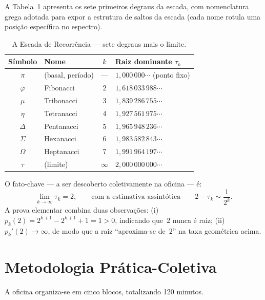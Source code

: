 \documentclass[11pt,a4paper]{article}
\begin{document}
A Tabela~\ref{tab:escada} apresenta os sete primeiros degraus da escada, com nomenclatura grega adotada para expor a estrutura de saltos da escada (cada nome rotula uma posição específica no espectro).

\begin{table}[h]
\centering
\small
\begin{tabular}{@{}clcl@{}}
\toprule
Símbolo & Nome & $k$ & Raiz dominante $\tau_k$ \\
\midrule
$\pi$ & (basal, período) & --- & $1{,}000\,000\cdots$ (ponto fixo) \\
$\varphi$ & Fibonacci        & 2 & $1{,}618\,033\,988\cdots$ \\
$\mu$     & Tribonacci       & 3 & $1{,}839\,286\,755\cdots$ \\
$\eta$    & Tetranacci       & 4 & $1{,}927\,561\,975\cdots$ \\
$\Delta$  & Pentanacci       & 5 & $1{,}965\,948\,236\cdots$ \\
$\Sigma$  & Hexanacci        & 6 & $1{,}983\,582\,843\cdots$ \\
$\Omega$  & Heptanacci       & 7 & $1{,}991\,964\,197\cdots$ \\
$\tau$    & (limite)         & $\infty$ & $2{,}000\,000\,000\cdots$ \\
\bottomrule
\end{tabular}
\caption{A Escada de Recorrência --- sete degraus mais o limite.\label{tab:escada}}
\end{table}

O fato-chave --- a ser descoberto coletivamente na oficina --- é:
\[
\lim_{k \to \infty} \tau_k = 2,
\qquad\text{com a estimativa assintótica}\qquad
2 - \tau_k \sim \dfrac{1}{2^k}.
\]
A prova elementar combina duas observações: (i)~$p_k(2) = 2^{k+1} - 2^{k+1} + 1 = 1 > 0$, indicando que~$2$ nunca é raiz; (ii)~$p_k'(2) \to \infty$, de modo que a raiz ``aproxima-se de~$2$'' na taxa geométrica acima.

\section*{Metodologia Prática-Coletiva}

A oficina organiza-se em cinco blocos, totalizando 120 minutos.
\end{document}
